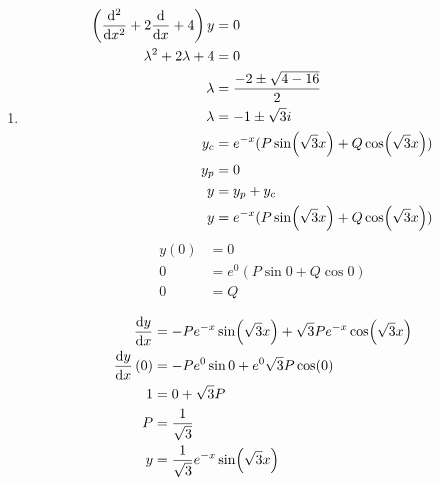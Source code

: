 \documentclass[10pt,\jkfside,a4paper]{article}
\begin{document}
\begin{enumerate}
\begin{enumerate}
\item
\begin{equation}
\begin{split}
\left(\dv[2]{x} + 2\dv{x} + 4\right)y &= 0\\
\lambda^2 + 2\lambda + 4 &= 0\\
\lambda &= \frac{-2 \pm \sqrt{4 - 16}}{2}\\
\lambda &= -1 \pm \sqrt{3}i\\
y_c &= e^{-x}(P\sin (\sqrt{3}x) + Q \cos (\sqrt{3}x))\\
y_p &= 0 \\
y &= y_p + y_c \\
y &= e^{-x}(P\sin (\sqrt{3}x) + Q \cos (\sqrt{3}x))
\end{split}
\end{equation}
\begin{equation}
\begin{split}
y(0) &= 0\\
0 &= e^0(P\sin 0 + Q \cos 0)\\
0 &= Q \\
\end{split}
\end{equation}
\begin{equation}
\begin{split}
\dv{y}{x} &= -Pe^{-x}\sin (\sqrt{3}x) + \sqrt{3}Pe^{-x}\cos(\sqrt{3}x)\\
\dv{y}{x}\left(0\right) &= -Pe^{0}\sin 0 + e^{0}\sqrt{3}P\cos(0)\\
1 &= 0 + \sqrt{3}P\\
P &= \frac{1}{\sqrt{3}}\\
y &= \frac{1}{\sqrt{3}}e^{-x}\sin(\sqrt{3}x)\\
\end{split}
\end{equation}


\end{enumerate}
\end{enumerate}
\end{document}
